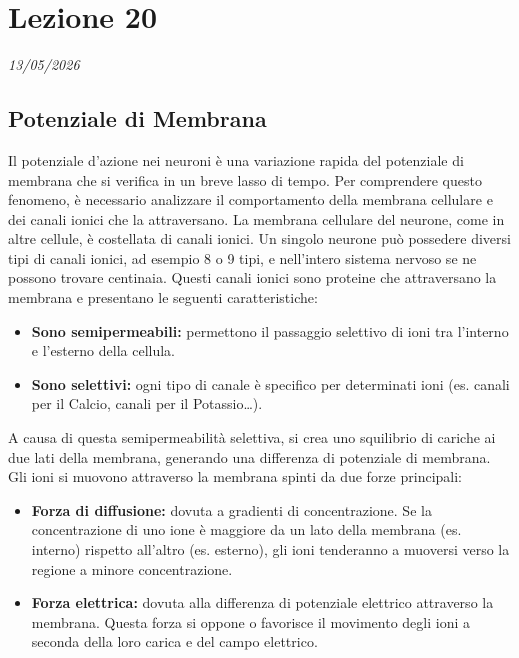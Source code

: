 \chapter{Lezione 20}
\label{capitolo_20}
\textit{13/05/2026}

\section{Potenziale di Membrana}
Il potenziale d'azione nei neuroni è una variazione rapida del potenziale di membrana che si verifica in un breve lasso di tempo. Per comprendere questo fenomeno, è necessario analizzare il comportamento della membrana cellulare e dei canali ionici che la attraversano.
La membrana cellulare del neurone, come in altre cellule, è costellata di canali ionici. Un singolo neurone può possedere diversi tipi di canali ionici, ad esempio 8 o 9 tipi, e nell'intero sistema nervoso se ne possono trovare centinaia. Questi canali ionici sono proteine che attraversano la membrana e presentano le seguenti caratteristiche:

\begin{itemize}
    \item \textbf{Sono semipermeabili:} permettono il passaggio selettivo di ioni tra l'interno e l'esterno della cellula.
    \item \textbf{Sono selettivi:} ogni tipo di canale è specifico per determinati ioni (es. canali per il Calcio, canali per il Potassio\dots).
\end{itemize}

A causa di questa semipermeabilità selettiva, si crea uno squilibrio di cariche ai due lati della membrana, generando una differenza di potenziale di membrana. Gli ioni si muovono attraverso la membrana spinti da due forze principali:

\begin{itemize}
    \item \textbf{Forza di diffusione:} dovuta a gradienti di concentrazione. Se la concentrazione di uno ione è maggiore da un lato della membrana (es. interno) rispetto all'altro (es. esterno), gli ioni tenderanno a muoversi verso la regione a minore concentrazione.
    \item \textbf{Forza elettrica:} dovuta alla differenza di potenziale elettrico attraverso la membrana. Questa forza si oppone o favorisce il movimento degli ioni a seconda della loro carica e del campo elettrico.
\end{itemize}

